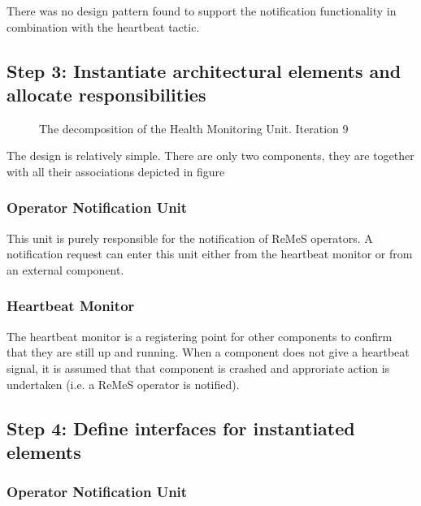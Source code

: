 \npar There was no design pattern found to support the notification
functionality in combination with the heartbeat tactic.

\subsection{Step 3: Instantiate architectural elements and allocate responsibilities}
\label{add:it8/elements}

\begin{figure}[H]
	\begin{centering}
		\caption{The decomposition of the Health Monitoring Unit. Iteration
		9}
		\label{fig:add/it9/decomposition}
	\end{centering}
\end{figure}

\npar The design is relatively simple. There are only two components, they are
together with all their associations depicted in figure
\subsubsection{Operator Notification Unit}

\npar This unit is purely responsible for the notification of ReMeS operators. A
notification request can enter this unit either from the heartbeat monitor or
from an external component.

\subsubsection{Heartbeat Monitor}

\npar The heartbeat monitor is a registering point for other components to
confirm that they are still up and running. When a component does not give a
heartbeat signal, it is assumed that that component is crashed and approriate
action is undertaken (i.e. a ReMeS operator is notified).

\subsection{Step 4: Define interfaces for instantiated elements}
\label{add:it8/interfaces}

\subsubsection{Operator Notification Unit}

